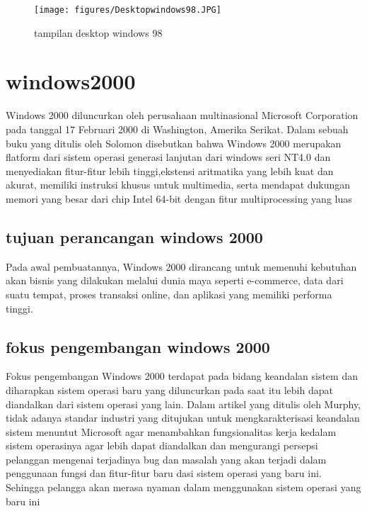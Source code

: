 		\begin{figure}[ht]
		\centerline{\texttt{[image: figures/Desktopwindows98.JPG]}}
		\caption{tampilan desktop windows 98}
		\label{Desktopwindows98}
		\end{figure}

\section{windows2000}
	Windows 2000 diluncurkan oleh perusahaan multinasional Microsoft Corporation pada tanggal 17 Februari 2000 di Washington, Amerika Serikat. 
	Dalam sebuah buku yang ditulis oleh Solomon disebutkan bahwa Windows 2000 merupakan flatform dari sistem operasi generasi lanjutan dari windows seri NT4.0 dan menyediakan fitur-fitur lebih tinggi,ekstensi aritmatika yang lebih kuat dan akurat, memiliki instruksi khusus untuk multimedia, serta mendapat dukungan memori yang besar dari chip Intel 64-bit dengan fitur multiprocessing yang luas \cite{solomon2000inside}
	\subsection{tujuan perancangan windows 2000}
		Pada awal pembuatannya, Windows 2000 dirancang untuk memenuhi kebutuhan akan bisnis yang dilakukan melalui dunia maya seperti e-commerce, data dari suatu tempat, proses transaksi online, dan aplikasi yang memiliki performa tinggi.
	\subsection{fokus pengembangan windows 2000}
		Fokus pengembangan Windows 2000 terdapat pada bidang keandalan sistem dan diharapkan sistem operasi baru yang diluncurkan pada saat itu lebih dapat diandalkan dari sistem operasi yang lain.
		Dalam artikel yang ditulis oleh Murphy, tidak adanya standar industri yang ditujukan untuk mengkarakterisasi keandalan sistem menuntut Microsoft agar menambahkan fungsionalitas kerja kedalam sistem operasinya agar lebih dapat diandalkan dan mengurangi persepsi pelanggan mengenai terjadinya bug dan masalah yang akan terjadi dalam penggunaan fungsi dan fitur-fitur baru dasi sistem operasi yang baru ini. Sehingga pelangga akan merasa nyaman dalam menggunakan sistem operasi yang baru ini \cite{murphy2000windows} 

